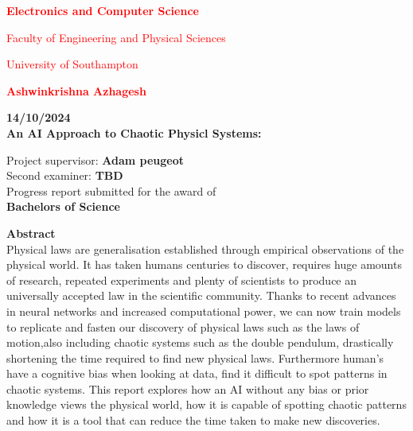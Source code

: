 \documentclass{article}
\begin{document}
\begin{center}
    \Large \textcolor{red}{\textbf{Electronics and Computer Science} \\[0.1cm]} 

    \large \textcolor{red}{Faculty of Engineering and Physical Sciences \\[0.1cm]} 

    \textcolor{red}{University of Southampton \\[1cm]} 

    \vspace{1cm} 

    \textcolor{red}{\textbf{\large Ashwinkrishna Azhagesh} \\[0.5cm]}

    \textbf{14/10/2024} \\[1cm] 

    \textbf{\large An AI Approach to Chaotic Physicl Systems: } \\[1cm]

    \vspace{0.5cm}

    Project supervisor: \textbf{Adam peugeot} \\[0.3cm] 
    Second examiner: \textbf{TBD} \\[1cm]

    Progress report submitted for the award of \\[0.1cm]

    \textbf{\large Bachelors of Science} 
\end{center}

\newpage

{\Huge \textbf{Abstract}}\\[1cm]

Physical laws are generalisation established through empirical observations
of the physical world. It has taken humans centuries to discover, requires huge
amounts of research, repeated experiments and plenty of scientists to produce
an universally accepted law in the scientific community. Thanks to recent
advances in neural networks and increased computational power, we can now
train models to replicate and fasten our discovery of physical laws such as the
laws of motion,also including chaotic systems such as the double pendulum,
drastically shortening the time required to find new physical laws. Furthermore
human’s have a cognitive bias when looking at data, find it difficult to spot
patterns in chaotic systems. This report explores how an AI without any bias or
prior knowledge views the physical world, how it is capable of spotting chaotic
patterns and how it is a tool that can reduce the time taken to make new
discoveries.\\
\end{document}
